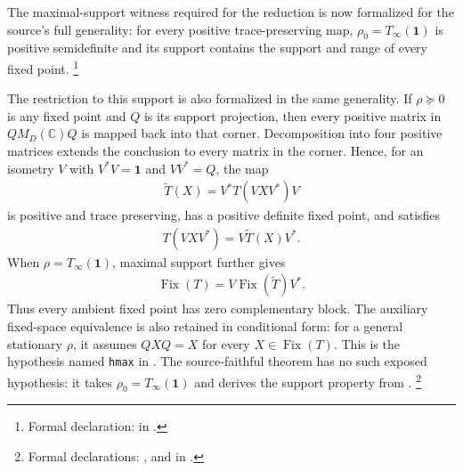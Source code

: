 \documentclass{article}
\begin{document}
The maximal-support witness required for the reduction is now formalized for the
source's full generality: for every positive trace-preserving map,
$\rho_0=T_\infty(\mathbf 1)$ is positive semidefinite and its support contains the
support and range of every fixed point.
\footnote{Formal declaration:
 in
.}

The restriction to this support is also formalized in the same generality.
If $\rho\succeq0$ is any fixed point and $Q$ is its support projection, then
every positive matrix in $Q M_D(\mathbb C)Q$ is mapped back into that corner.
Decomposition into four positive matrices extends the conclusion to every
matrix in the corner.  Hence, for an isometry $V$ with $V^*V=\mathbf 1$ and
$VV^*=Q$, the map
\begin{align}
  \widetilde T(X)=V^*T(VXV^*)V
\end{align}
is positive and trace preserving, has a positive definite fixed point, and
satisfies
\begin{align}
  T(VXV^*)=V\widetilde T(X)V^*.
  \tag{Wolf, Equation (6.52)}
\end{align}
When $\rho=T_\infty(\mathbf 1)$, maximal support further gives
\begin{align}
  \operatorname{Fix}(T)=V\operatorname{Fix}(\widetilde T)V^*.
  \tag{Wolf, Equation (6.51)}
\end{align}
Thus every ambient fixed point has zero complementary block.
The auxiliary fixed-space equivalence is also retained in conditional form:
for a general stationary $\rho$, it assumes
$QXQ=X$ for every $X\in\operatorname{Fix}(T)$.  This is the hypothesis named
\texttt{hmax} in
.
The source-faithful theorem
 has no such exposed
hypothesis: it takes $\rho_0=T_\infty(\mathbf 1)$ and derives the support property
from .
\footnote{Formal declarations:
,
and
in
.}
\end{document}
